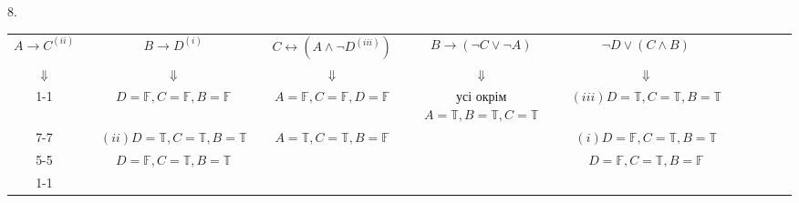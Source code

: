 \documentclass[a4paper,12pt]{article}
\begin{document}
\begin{enumerate}
\newpage
\begin{landscape}
8.\begin{table}[htp]
\begin{tabular}{clclcccccccccc}
$A\rightarrow C^{(ii)}$                                                        &                       & $B\rightarrow D^{(i)}$                                                                      &                       & $C\leftrightarrow (A\land\neg D^{(iii)})$                       &                       & $B\rightarrow(\neg C\lor\neg A)$                                          &                       & $\neg D\lor(C\land B)$                                                                       &  &  &  &  &  \\
$\Downarrow$                                                                   &                       & $\Downarrow$                                                                                &                       & $\Downarrow$                                                    &                       & $\Downarrow$                                                              &                       & $\Downarrow$                                                                                 &  &  &  &  &  \\ \cline{1-1} \cline{3-3} \cline{5-5} \cline{7-7} \cline{9-9}
\multicolumn{1}{|c|}{$A=\mathbb{F},C=\mathbb{F}$}                              & \multicolumn{1}{l|}{} & \multicolumn{1}{c|}{$D=\mathbb{F}, C=\mathbb{F},B=\mathbb{F}$}                              & \multicolumn{1}{l|}{} & \multicolumn{1}{c|}{$A=\mathbb{F}, C=\mathbb{F}, D=\mathbb{F}$} & \multicolumn{1}{c|}{} & \multicolumn{1}{c|}{усі окрім $A=\mathbb{T}, B=\mathbb{T}, C=\mathbb{T}$} & \multicolumn{1}{c|}{} & \multicolumn{1}{c|}{\cellcolor[HTML]{FFCCC9}$(iii)D=\mathbb{T}, C=\mathbb{T}, B=\mathbb{T}$} &  &  &  &  &  \\ \cline{7-7}
\multicolumn{1}{|c|}{\cellcolor[HTML]{FFCCC9}$(iii)A=\mathbb{F},C=\mathbb{T}$} & \multicolumn{1}{l|}{} & \multicolumn{1}{c|}{\cellcolor[HTML]{FFCCC9}$(ii)D=\mathbb{T}, C=\mathbb{T}, B=\mathbb{T}$} & \multicolumn{1}{l|}{} & \multicolumn{1}{c|}{$A=\mathbb{T}, C=\mathbb{T}, B=\mathbb{F}$} &                       &                                                                           & \multicolumn{1}{c|}{} & \multicolumn{1}{c|}{\cellcolor[HTML]{FFCCC9}$(i)D=\mathbb{F}, C=\mathbb{T},B=\mathbb{T}$}    &  &  &  &  &  \\ \cline{5-5}
\multicolumn{1}{|c|}{$A=\mathbb{T},C=\mathbb{T}$}                              & \multicolumn{1}{l|}{} & \multicolumn{1}{c|}{$D=\mathbb{F}, C=\mathbb{T}, B=\mathbb{T}$}                             &                       &                                                                 &                       &                                                                           & \multicolumn{1}{c|}{} & \multicolumn{1}{c|}{$D=\mathbb{F}, C=\mathbb{T}, B=\mathbb{F}$}                              &  &  &  &  &  \\ \cline{1-1} \cline{3-3}

\end{tabular}
\end{table}
\end{landscape}
\end{enumerate}
\end{document}
